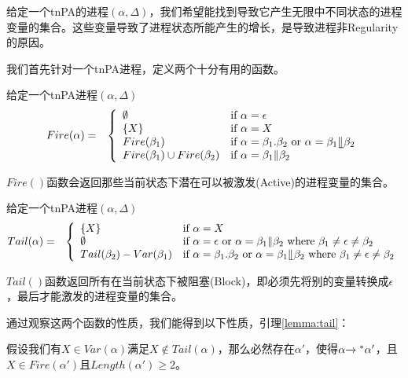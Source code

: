给定一个tnPA的进程$(\alpha,\Delta)$，我们希望能找到导致它产生无限中不同状态的进程变量的集合。这些变量导致了进程状态所能产生的增长，是导致进程非Regularity的原因。

我们首先针对一个tnPA进程，定义两个十分有用的函数。

\begin{defn}[Fire 函数]\label{def:fire}
给定一个tnPA进程$(\alpha,\Delta)$
\begin{eqnarray*}
Fire(\alpha) &=& \left\{ \begin{array}{ll}
\emptyset & \mbox{if }\alpha=\epsilon\\
\{X\} & \mbox{if }\alpha=X\\
Fire(\beta_1) & \mbox{if }\alpha=\beta_1.\beta_2\mbox{ or }\alpha=\beta_1\llfloor\beta_2\\
Fire(\beta_1)\cup Fire(\beta_2) & \mbox{if }\alpha=\beta_1\|\beta_2
\end{array}\right.
\end{eqnarray*}
\end{defn}

$Fire()$函数会返回那些当前状态下潜在可以被激发(Active)的进程变量的集合。

\begin{defn}[Tail 函数]\label{def:tail}
给定一个tnPA进程$(\alpha,\Delta)$
\begin{eqnarray*}
Tail(\alpha) &=& \left\{ \begin{array}{ll}
\{X\} & \mbox{if }\alpha=X\\
\emptyset & \mbox{if }\alpha=\epsilon \mbox{ or } \alpha=\beta_1\|\beta_2 \mbox{ where } \beta_1\neq\epsilon\neq\beta_2\\
Tail(\beta_2)-Var(\beta_1) &\mbox{if }\alpha=\beta_1.\beta_2 \mbox{ or }\alpha=\beta_1\llfloor\beta_2\mbox{ where }\beta_1\neq\epsilon\neq\beta_2
\end{array}\right.
\end{eqnarray*}
\end{defn}

$Tail()$函数返回所有在当前状态下被阻塞(Block)，即必须先将别的变量转换成$\epsilon$，最后才能激发的进程变量的集合。

通过观察这两个函数的性质，我们能得到以下性质，引理\ref{lemma:tail}：

\begin{lem}\label{lemma:tail}
假设我们有$X\in Var(\alpha)$满足$X\notin Tail(\alpha)$，那么必然存在$\alpha'$，使得$\alpha{\xrightarrow{}{}}^{*}\alpha'$，且$X\in Fire(\alpha')$且$Length(\alpha')\geq 2$。
\end{lem}

